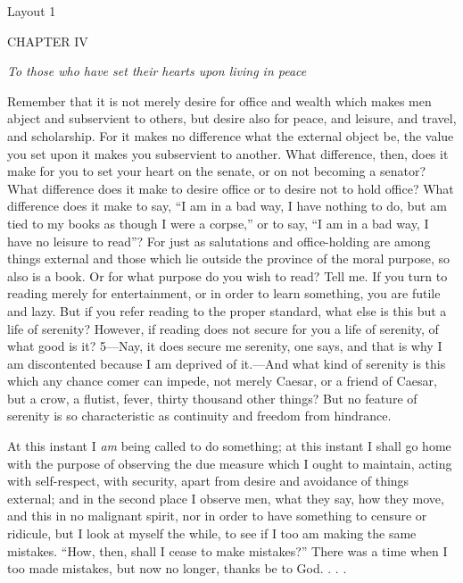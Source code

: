 

Layout 1

CHAPTER IV

\emph{To those who have set their hearts upon living in peace}

Remember that it is not merely desire for office and wealth which makes men abject and subservient to others, but desire also for peace, and leisure, and travel, and scholarship. For it makes no difference what the external object be, the value you set upon it makes you subservient to another. What difference, then, does it make for you to set your heart on the senate, or on not becoming a senator? What difference does it make to desire office or to desire not to hold office? What difference does it make to say, ``I am in a bad way, I have nothing to do, but am tied to my books as though I were a corpse,'' or to say, ``I am in a bad way, I have no leisure to read''? For just as salutations and office-holding are among things external and those which lie outside the province of the moral purpose, so also is a book. Or for what purpose do you wish to read? Tell me. If you turn to reading merely for entertainment, or in order to learn something, you are futile and lazy. But if you refer reading to the proper standard, what else is this but a life of serenity? However, if reading does not secure for you a life of serenity, of what good is it? 5—Nay, it does secure me serenity, one says, and that is why I am discontented because I am deprived of it.—And what kind of serenity is this which any chance comer can impede, not merely Caesar, or a friend of Caesar, but a crow, a flutist, fever, thirty thousand other things? But no feature of serenity is so characteristic as continuity and freedom from hindrance.

At this instant I \emph{am} being called to do something; at this instant I shall go home with the purpose of observing the due measure which I ought to maintain, acting with self-respect, with security, apart from desire and avoidance of things external; and in the second place I observe men, what they say, how they move, and this in no malignant spirit, nor in order to have something to censure or ridicule, but I look at myself the while, to see if I too am making the same mistakes. ``How, then, shall I cease to make mistakes?'' There was a time when I too made mistakes, but now no longer, thanks be to God. . . .

